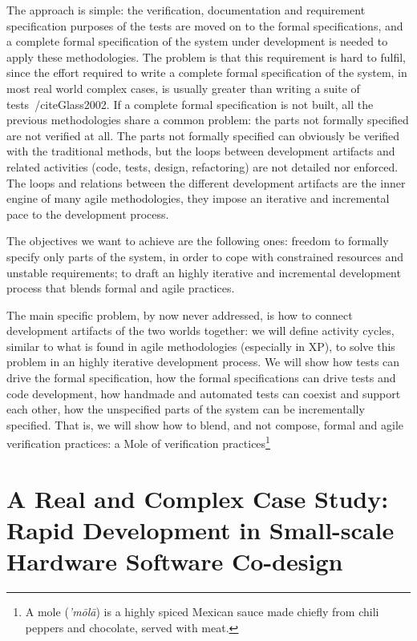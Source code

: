 \documentclass[english]{lni}
\begin{document}
The approach is simple: the verification, documentation and requirement specification purposes of the tests are moved on to the formal specifications, and a complete formal specification of the system under development is needed to apply these methodologies.
The problem is that this requirement is hard to fulfil, since the effort required to write a complete formal specification of the system, in most real world complex cases, is usually greater than writing a suite of tests~/cite{Glass2002}.
If a complete formal specification is not built, all the previous methodologies share a common problem: the parts not formally specified are not verified at all.
The parts not formally specified can obviously be verified with the traditional methods, but the loops between development artifacts and related activities (code, tests, design, refactoring) are not detailed nor enforced.
The loops and relations between the different development artifacts are the inner engine of many agile methodologies, they impose an iterative and incremental pace to the development process.

The objectives we want to achieve are the following ones: freedom to formally specify only parts of the system, in order to cope with constrained resources and unstable requirements; to draft an highly iterative and incremental development process that blends formal and agile practices.

The main specific problem, by now never addressed, is how to connect development artifacts of the two worlds together: we will define activity cycles, similar to what is found in agile methodologies (especially in XP), to solve this problem in an highly iterative development process.
We will show how tests can drive the formal specification, how the formal specifications can drive tests and code development, how handmade and automated tests can coexist and support each other, how the unspecified parts of the system can be incrementally specified.
That is, we will show how to blend, and not compose, formal and agile verification practices: a Mole of verification practices\footnote{A mole (\emph{'m\=ol\=a}) is a highly spiced Mexican sauce made chiefly from chili peppers and chocolate, served with meat.}

\section{A Real and Complex Case Study: \\ Rapid Development in Small-scale Hardware Software Co-design}
\label{subsec:a_real_and_complex_case_study}
\end{document}
